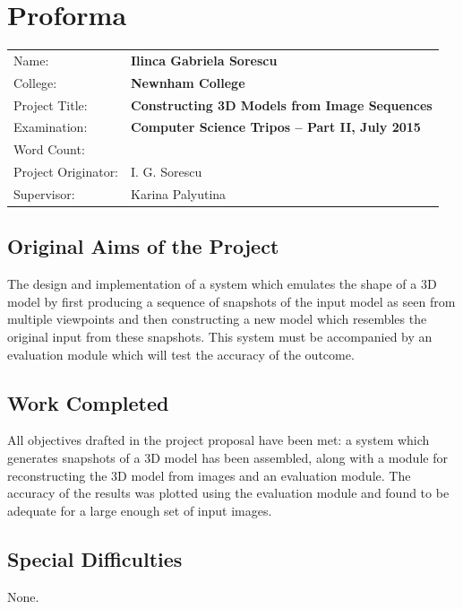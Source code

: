 \documentclass[12pt,a4paper,twoside,openright]{report}
\begin{document}

\pagestyle{plain}

\chapter*{Proforma}

{\large
\begin{tabular}{ll}
Name:               & \bf Ilinca Gabriela Sorescu                       \\
College:            & \bf Newnham College                               \\
Project Title:      & \bf Constructing 3D Models from Image Sequences   \\
Examination:        & \bf Computer Science Tripos -- Part II, July 2015  \\
Word Count:         & \bf  \\
Project Originator: & I. G. Sorescu                     \\
Supervisor:         & Karina Palyutina                  \\ 
\end{tabular}
}



\section*{Original Aims of the Project}
The design and implementation of a system which emulates the shape of a 3D model by first producing a sequence of snapshots of the input model as seen from multiple viewpoints and then constructing a new model which resembles the original input from these snapshots. This system must be accompanied by an evaluation module which will test the accuracy of the outcome.


\section*{Work Completed}
All objectives drafted in the project proposal have been met: a system which generates snapshots of a 3D model has been assembled, along with a module for reconstructing the 3D model from images and an evaluation module. The accuracy of the results was plotted using the evaluation module and found to be adequate for a large enough set of input images.  

\section*{Special Difficulties}
None.
\end{document}
